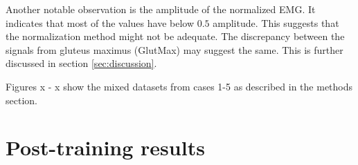 \documentclass[../main.tex]{subfiles}
\begin{document}
Another notable observation is the amplitude of the normalized \ac{EMG}.
It indicates that most of the values have below $0.5$ amplitude.
This suggests that the normalization method might not be adequate.
The discrepancy between the signals from gluteus maximus (GlutMax) may suggest the same. 
This is further discussed in section \ref{sec:discussion}.

Figures x - x show the mixed datasets from cases 1-5 as described in the methods section.

\section{Post-training results}
\label{sec:post-training-results}


\end{document}
